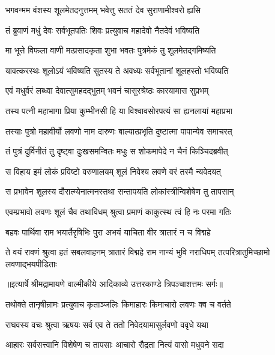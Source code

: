 \twolineshloka
{भगवन्मम वंशस्य शूलमेतदनुत्तमम्}
{भवेत्तु सततं देव सुराणामीश्वरो ह्यसि} %

\twolineshloka
{तं ब्रुवाणं मधुं देवः सर्वभूतपतिः शिवः}
{प्रत्युवाच महादेवो नैतदेवं भविष्यति} %

\twolineshloka
{मा भूत्ते विफला वाणी मत्प्रसादकृता शुभा}
{भवतः पुत्रमेकं तु शूलमेतद्गमिष्यति} %

\twolineshloka
{यावत्करस्थः शूलोऽयं भविष्यति सुतस्य ते}
{अवध्यः सर्वभूतानां शूलहस्तो भविष्यति} %

\twolineshloka
{एवं मधुर्वरं लब्ध्वा देवात्सुमहदद्भुतम्}
{भवनं चासुरश्रेष्ठः कारयामास सुप्रभम्} %

\twolineshloka
{तस्य पत्नी महाभागा प्रिया कुम्भीनसी हि या}
{विश्वावसोरपत्यं सा ह्यनलायां महाप्रभा} %

\twolineshloka
{तस्याः पुत्रो महावीर्यो लवणो नाम दारुणः}
{बाल्यात्प्रभृति दुष्टात्मा पापान्येव समाचरत्} %

\twolineshloka
{तं पुत्रं दुर्विनीतं तु दृष्ट्वा दुःखसमन्वितः}
{मधुः स शोकमापेदे न चैनं किञ्चिदब्रवीत्} %

\twolineshloka
{स विहाय इमं लोकं प्रविष्टो वरुणालयम्}
{शूलं निवेश्य लवणे वरं तस्मै न्यवेदयत्} %

\twolineshloka
{स प्रभावेन शूलस्य दौरात्म्येनात्मनस्तथा}
{सन्तापयति लोकांस्त्रीन्विशेषेण तु तापसान्} %

\twolineshloka
{एवम्प्रभावो लवणः शूलं चैव तथाविधम्}
{श्रुत्वा प्रमाणं काकुत्स्थ त्वं हि नः परमा गतिः} %

\twolineshloka
{बहवः पार्थिवा राम भयार्तैरृषिभिः पुरा}
{अभयं याचिता वीर त्रातारं न च विद्महे} %

\threelineshloka
{ते वयं रावणं श्रुत्वा हतं सबलवाहनम्}
{त्रातारं विद्महे राम नान्यं भुवि नराधिपम्}
{तत्परित्रातुमिच्छामो लवणाद्भयपीडिताः} %


{॥इत्यार्षे श्रीमद्रामायणे वाल्मीकीये आदिकाव्ये उत्तरकाण्डे त्रिपञ्चाशत्तमः सर्गः॥}


\twolineshloka
{तथोक्ते तानृषीन्रामः प्रत्युवाच कृताञ्जलिः}
{किमाहारः किमाचारो लवणः क्व च वर्तते} %

\twolineshloka
{राघवस्य वचः श्रुत्वा ऋषयः सर्व एव ते}
{ततो निवेदयामासुर्लवणो ववृधे यथा} %

\twolineshloka
{आहारः सर्वसत्त्वानि विशेषेण च तापसाः}
{आचारो रौद्रता नित्यं वासो मधुवने सदा} %

